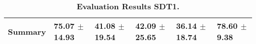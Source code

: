 \begin{table}[htb]
{\begin{tabular}{llllll}
\midrule
\textbf{Summary                                  } &                  \phantom{0}75.07 $\pm$ 14.93 &                      \phantom{0}41.08 $\pm$ 19.54 &                  \phantom{0}42.09 $\pm$ 25.65 &            \phantom{0}36.14 $\pm$ 18.74 &  \phantom{0}78.60 $\pm$ \phantom{0}9.38 \\
\bottomrule
\end{tabular}%
}
\caption{\textbf{Evaluation Results SDT1.}}
\label{tab:eval-results}
\end{table}


